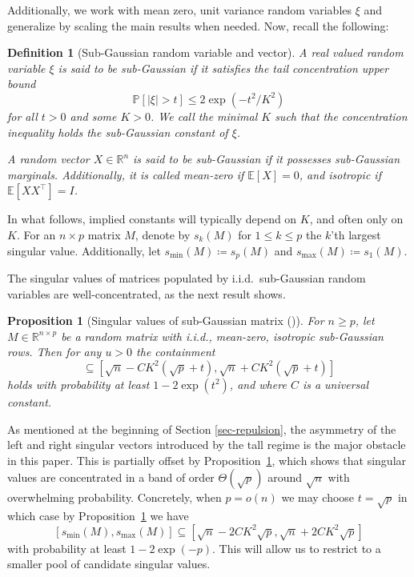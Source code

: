 \documentclass[11pt]{article}
\numberwithin{equation}{section}
\newtheorem{proposition}[theorem]{Proposition}
\newtheorem{definition}[theorem]{Definition}
\theoremstyle{remark}
\newcommand{\R}{\mathbb{R}}
\newcommand{\E}{\mathbb{E}}
\newcommand{\Prob}{\mathbb{P}}
\newcommand{\MinSingVal}{s_{\mathrm{min}}}
\newcommand{\MaxSingVal}{s_{\mathrm{max}}}
\begin{document}
Additionally, we work with mean zero, unit variance random variables $\xi$ and generalize by scaling the main results when needed. Now, recall the following:

\begin{definition}[Sub-Gaussian random variable and vector]\label{def-subgaussian}
    A real valued random variable $\xi$ is said to be sub-Gaussian if it satisfies the tail concentration upper bound
    \begin{equation*}
        \Prob[|\xi| > t] \leq 2\exp(-t^2/K^2)
    \end{equation*}
    for all $t > 0$ and some $K > 0$. We call the minimal $K$ such that the concentration inequality holds the sub-Gaussian constant of $\xi$.

    A random vector $X \in \R^n$ is said to be sub-Gaussian if it possesses sub-Gaussian marginals. Additionally, it is called mean-zero if $\E[X] = 0$, and isotropic if $\E[XX^\top] = I$.
\end{definition}

In what follows, implied constants will typically depend on $K$, and often only on $K$. For an $n \times p$ matrix $M$, denote by $s_k(M)$ for $1 \leq k \leq p$ the $k$'th largest singular value. Additionally, let $\MinSingVal(M) \coloneqq s_p(M)$ and $\MaxSingVal(M) \coloneqq s_1(M)$.

The singular values of matrices populated by i.i.d.\ sub-Gaussian random variables are well-concentrated, as the next result shows.

\begin{proposition}[Singular values of sub-Gaussian matrix ({\cite[Theorem 4.6.1]{vershynin2018high}})]\label{prop-sing-val-concentration}
    For $n \geq p$, let $M \in \R^{n \times p}$ be a random matrix with i.i.d., mean-zero, isotropic sub-Gaussian rows. Then for any $u > 0$ the containment
    \begin{equation*}
        [\MinSingVal(M),\MaxSingVal(M)] \subseteq [\sqrt{n} - CK^2(\sqrt{p} + t), \sqrt{n} + CK^2(\sqrt{p} + t)]
    \end{equation*}
    holds with probability at least $1 - 2\exp(t^2)$, and where $C$ is a universal constant. 
\end{proposition}

As mentioned at the beginning of Section \ref{sec-repulsion}, the asymmetry of the left and right singular vectors introduced by the tall regime is the major obstacle in this paper. This is partially offset by Proposition~\ref{prop-sing-val-concentration}, which shows that singular values are concentrated in a band of order $\Theta(\sqrt{p})$ around $\sqrt{n}$ with overwhelming probability. Concretely, when $p = o(n)$ we may choose $t = \sqrt{p}$ in which case by Proposition~\ref{prop-sing-val-concentration} we have
\begin{equation}\label{eq-sing-val-range}
       [\MinSingVal(M),\MaxSingVal(M)] \subseteq [\sqrt{n} - 2CK^2\sqrt{p}, \sqrt{n} + 2CK^2\sqrt{p}]
\end{equation}
with probability at least $1 - 2\exp(-p)$. This will allow us to restrict to a smaller pool of candidate singular values.
\end{document}
